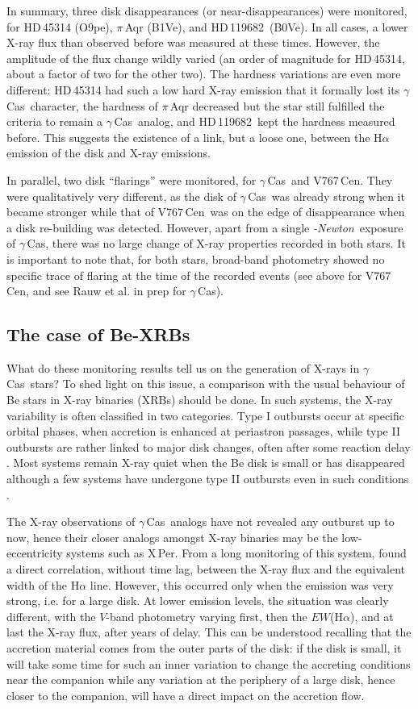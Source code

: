 \documentclass[a4paper,fleqn,usenatbib]{mnras}
\newcommand{\xmm}{{\sc{XMM}}\emph{-Newton}}
\newcommand{\gc}{$\gamma$\,Cas}
\newcommand{\hd}{HD\,119682}
\newcommand{\vc}{V767\,Cen}
\begin{document}
In summary, three disk disappearances (or near-disappearances) were monitored, for HD\,45314 (O9pe), $\pi$\,Aqr (B1Ve), and \hd\ (B0Ve). In all cases, a lower X-ray flux than observed before was measured at these times. However, the amplitude of the flux change wildly varied (an order of magnitude for HD\,45314, about a factor of two for the other two). The hardness variations are even more different: HD\,45314 had such a low hard X-ray emission that it formally lost its \gc\ character, the hardness of $\pi$\,Aqr decreased but the star still fulfilled the criteria to remain a \gc\ analog, and \hd\ kept the hardness measured before. This suggests the existence of a link, but a loose one, between the H$\alpha$ emission of the disk and X-ray emissions.

In parallel, two disk ``flarings'' were monitored, for \gc\ and \vc. They were qualitatively very different, as the disk of \gc\ was already strong when it became stronger while that of \vc\ was on the edge of disappearance when a disk re-building was detected. However, apart from a single \xmm\ exposure of \gc, there was no large change of X-ray properties recorded in both stars. It is important to note that, for both stars, broad-band photometry showed no specific trace of flaring at the time of the recorded events (see above for \vc, and see Rauw et al. in prep for \gc). 

\subsection{The case of Be-XRBs}
What do these monitoring results tell us on the generation of X-rays in \gc\ stars? To shed light on this issue, a comparison with the usual behaviour of Be stars in X-ray binaries (XRBs) should be done. In such systems, the X-ray variability is often classified in two categories. Type I outbursts occur at specific orbital phases, when accretion is enhanced at periastron passages, while type II outbursts are rather linked to major disk changes, often after some reaction delay \citep[e.g.][]{gru07,cam12,lut12,alf17}. Most systems remain X-ray quiet when the Be disk is small or has disappeared \citep{neg01} although a few systems have undergone type II outbursts even in such conditions \citep{mon17}.

The X-ray observations of \gc\ analogs have not revealed any outburst up to now, hence their closer analogs amongst X-ray binaries may be the low-eccentricity systems such as X\,Per. From a long monitoring of this system, \citet{zam19} found a direct correlation, without time lag, between the X-ray flux and the equivalent width of the H$\alpha$ line. However, this occurred only when the emission was very strong, i.e. for a large disk. At lower emission levels, the situation was clearly different, with the $V$-band photometry varying first, then the $EW$(H$\alpha$), and at last the X-ray flux, after years of delay. This can be understood recalling that the accretion material comes from the outer parts of the disk: if the disk is small, it will take some time for such an inner variation to change the accreting conditions near the companion while any variation at the periphery of a large disk, hence closer to the companion, will have a direct impact on the accretion flow. 
\end{document}

